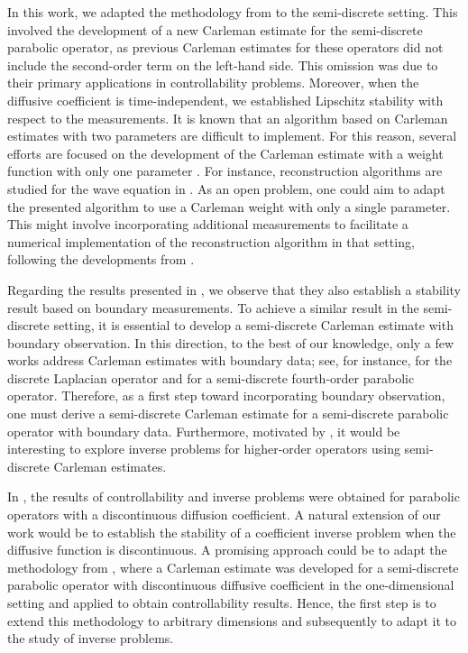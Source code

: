 \documentclass{amsart}
\numberwithin{equation}{section}
\begin{document}
    In this work, we adapted the methodology from \cite{IY-1998} to the semi-discrete setting. This involved the development of a new Carleman estimate for the semi-discrete parabolic operator, as previous Carleman estimates for these operators did not include the second-order term on the left-hand side. This omission was due to their primary applications in controllability problems. Moreover, when the diffusive coefficient is time-independent, we established Lipschitz stability with respect to the measurements. It is known that an algorithm based on Carleman estimates with two parameters are difficult to implement. For this reason, several efforts are focused on the development of the Carleman estimate with a weight function with only one parameter \cite{KJZ:2020}. For instance, reconstruction algorithms are studied for the wave equation in \cite{BDBE:2013,BE:2013,BEO-2015}. 
    As an open problem, one could aim to adapt the presented algorithm to use a Carleman weight with only a single parameter. This might involve incorporating additional measurements to facilitate a numerical implementation of the reconstruction algorithm in that setting, following the developments from \cite{BEO-2015}.
    
    Regarding the results presented in \cite{IY-1998}, we observe that they also establish a stability result based on boundary measurements. To achieve a similar result in the semi-discrete setting, it is essential to develop a semi-discrete Carleman estimate with boundary observation. In this direction, to the best of our knowledge, only a few works address Carleman estimates with boundary data; see, for instance, \cite{LOPD:2023,ZY-2024} for the discrete Laplacian operator and \cite{CLNP2022} for a semi-discrete fourth-order parabolic operator. Therefore, as a first step toward incorporating boundary observation, one must derive a semi-discrete Carleman estimate for a semi-discrete parabolic operator with boundary data. Furthermore, motivated by \cite{CLNP2022,WZ:2024}, it would be interesting to explore inverse problems for higher-order operators using semi-discrete Carleman estimates.
    
    In \cite{BDLR:2007}, the results of controllability and inverse problems were obtained for parabolic operators with a discontinuous diffusion coefficient. A natural extension of our work would be to establish the stability of a coefficient inverse problem when the diffusive function is discontinuous. A promising approach could be to adapt the methodology from \cite{N:2014}, where a Carleman estimate was developed for a semi-discrete parabolic operator with discontinuous diffusive coefficient in the one-dimensional setting and applied to obtain controllability results. Hence, the first step is to extend this methodology to arbitrary dimensions and subsequently to adapt it to the study of inverse problems.
    
\end{document}
